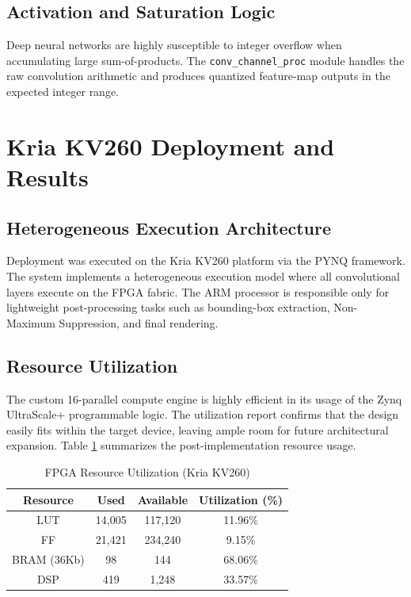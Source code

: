 \documentclass[conference]{IEEEtran}
\begin{document}
\subsection{Activation and Saturation Logic}
Deep neural networks are highly susceptible to integer overflow when accumulating large sum-of-products. The \texttt{conv\_channel\_proc} module handles the raw convolution arithmetic and produces quantized feature-map outputs in the expected integer range.

\section{Kria KV260 Deployment and Results}

\subsection{Heterogeneous Execution Architecture}
Deployment was executed on the Kria KV260 platform via the PYNQ framework. The system implements a heterogeneous execution model where all convolutional layers execute on the FPGA fabric. The ARM processor is responsible only for lightweight post-processing tasks such as bounding-box extraction, Non-Maximum Suppression, and final rendering.

\subsection{Resource Utilization}
The custom 16-parallel compute engine is highly efficient in its usage of the Zynq UltraScale+ programmable logic. The utilization report confirms that the design easily fits within the target device, leaving ample room for future architectural expansion. Table \ref{tab:utilization} summarizes the post-implementation resource usage.

\begin{table}[htbp]
\caption{FPGA Resource Utilization (Kria KV260)}
\label{tab:utilization}
\begin{center}
\begin{tabular}{|c|c|c|c|}
\hline
\textbf{Resource} & \textbf{Used} & \textbf{Available} & \textbf{Utilization (\%)} \\
\hline
LUT & 14,005 & 117,120 & 11.96\% \\
\hline
FF & 21,421 & 234,240 & 9.15\% \\
\hline
BRAM (36Kb) & 98 & 144 & 68.06\% \\
\hline
DSP & 419 & 1,248 & 33.57\% \\
\hline
\end{tabular}
\end{center}
\end{table}
\end{document}
